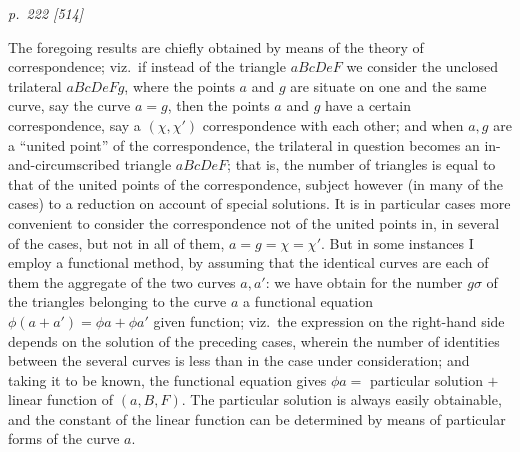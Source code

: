 \documentclass[11pt,a4paper]{article}
\theoremstyle{plain}
\theoremstyle{definition}
\begin{document}
\begin{center}
\renewcommand{\arraystretch}{1.25}
\end{center}

\clearpage

\bigskip
\textit{p.~222 [514]}
\smallskip

The foregoing results are chiefly obtained by means of the theory of correspondence;
viz.\ if instead of the triangle $aBcDeF$ we consider the unclosed trilateral $aBcDeFg$,
where the points $a$ and $g$ are situate on one and the same curve, say the curve
$a=g$, then the points $a$ and $g$ have a certain correspondence, say a $(\chi, \chi')$ correspondence with each other; and when $a, g$ are a ``united point'' of the correspondence,
the trilateral in question becomes an in-and-circumscribed triangle $aBcDeF$; that is,
the number of triangles is equal to that of the united points of the correspondence,
subject however (in many of the cases) to a reduction on account of special solutions.
It is in particular cases more convenient to consider the correspondence not of the united
points in, in several of the cases, but not in all of them, $a=g=\chi=\chi'$.  But in some
instances I employ a functional method, by assuming that the identical curves are each
of them the aggregate of the two curves $a, a'$: we have obtain for the number $g\sigma$
of the triangles belonging to the curve $a$ a functional equation $\phi(a+a')=\phi a+\phi a'$
given function; viz.\ the expression on the right-hand side depends on the solution of
the preceding cases, wherein the number of identities between the several curves is
less than in the case under consideration; and taking it to be known, the functional
equation gives $\phi a=$ particular solution $+$ linear function of $(a, B, F)$.  The particular
solution is always easily obtainable, and the constant of the linear function can be
determined by means of particular forms of the curve $a$.
\end{document}
